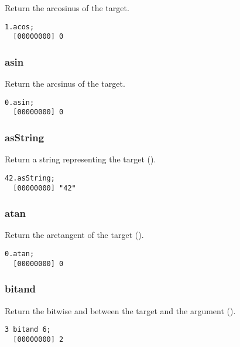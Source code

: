Return the arcosinus of the target.

\begin{lstlisting}[caption=Float.acos, label=lst:float-acos,
  float=\floatposh]
  1.acos;
  [00000000] 0
\end{lstlisting}

\subsubsection{asin}

Return the arcsinus of the target.

\begin{lstlisting}[caption=Float.asin, label=lst:float-asin,
  float=\floatposh]
  0.asin;
  [00000000] 0
\end{lstlisting}

\subsubsection{asString}

Return a string representing the target ().

\begin{lstlisting}[caption=Float.asString, label=lst:float-asString,
  float=\floatposh]
  42.asString;
  [00000000] "42"
\end{lstlisting}

\subsubsection{atan}

Return the arctangent of the target ().

\begin{lstlisting}[caption=Float.atan, label=lst:float-atan,
  float=\floatposh]
  0.atan;
  [00000000] 0
\end{lstlisting}

\subsubsection{bitand}

Return the bitwise and between the target and the argument ().

\begin{lstlisting}[caption=Float.bitand, label=lst:float-bitand,
  float=\floatposh]
  3 bitand 6;
  [00000000] 2
\end{lstlisting}


